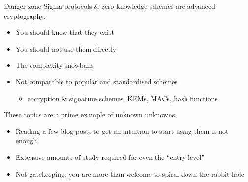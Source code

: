 \begin{frame}{Danger zone}
  Sigma protocols \& zero-knowledge schemes are advanced cryptography.
  \begin{itemize}[<+(1)->]
    \item You should know that they exist
    \item You should not use them directly
    \item The complexity snowballs
    \item Not comparable to popular and standardised schemes
    \begin{itemize}
      \item encryption \& signature schemes, KEMs, MACs, hash functions
    \end{itemize}
  \end{itemize}

  \vspace*{1em}

  \pause
  These topics are a prime example of unknown unknowns.
  \begin{itemize}[<+(1)->]
    \item Reading a few blog posts to get an intuition to start using them is not enough
    \item Extensive amounts of study required for even the \enquote{entry level}
    \item Not gatekeeping:
    you are more than welcome to spiral down the rabbit hole
  \end{itemize}
\end{frame}


